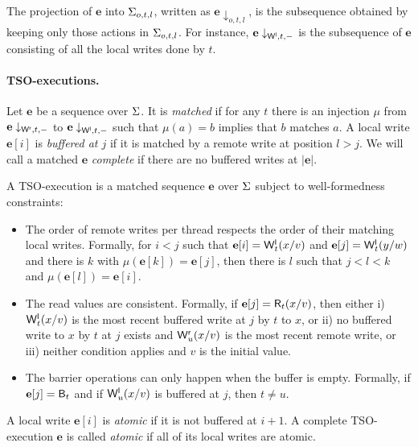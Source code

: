 The projection of $\mathbf{e}$ into $\Sigma_{o,t,l}$, written as $\mathbf{e}\downarrow_{o,t,l}$, is the subsequence obtained by keeping only those actions in $\Sigma_{o,t,l}$.
For instance, $\mathbf{e}\downarrow_{\mathsf{W}^{\mathsf{l}},t,-}$ is the subsequence of $\mathbf{e}$ consisting of all the local writes done by $t$.


\paragraph{TSO-executions.}
Let $\mathbf{e}$ be a sequence over $\Sigma$.
It is {\em matched} if for any $t$ there is an injection $\mu$ from $\mathbf{e}\downarrow_{\mathsf{W}^{\mathsf{r}},t,-}$ to $\mathbf{e}\downarrow_{\mathsf{W}^{\mathsf{l}},t,-}$ such that $\mu(a)=b$ implies that $b$ matches $a$.
A local write $\mathbf{e}[i]$ is {\em buffered at $j$} if it is matched by a remote write at position $l>j$.
We will call a matched $\mathbf{e}$ {\em complete} if there are no buffered writes at $|\mathbf{e}|$.

A TSO-execution is a matched sequence $\mathbf{e}$ over $\Sigma$ subject to well-formedness constraints:
\begin{itemize}
\item The order of remote writes per thread respects the order of their matching local writes.
Formally, for $i<j$ such that $\mathbf{e}[i]=\mathsf{W}^{\mathsf{l}}_{t}(x/v)$ and $\mathbf{e}[j]=\mathsf{W}^{\mathsf{l}}_{t}(y/w)$ and there is $k$ with $\mu(\mathbf{e}[k])=\mathbf{e}[j]$, then there is $l$ such that $j<l<k$ and $\mu(\mathbf{e}[l])=\mathbf{e}[i]$.
\item The read values are consistent.
Formally, if $\mathbf{e}[j]=\mathsf{R}_{t}(x/v)$, then either i) $\mathsf{W}^{\mathsf{l}}_{t}(x/v)$ is the most recent buffered write at $j$ by $t$ to $x$, or ii) no buffered write to $x$ by $t$ at $j$ exists and $\mathsf{W}^{\mathsf{r}}_{u}(x/v)$ is the most recent remote write, or iii) neither condition applies and $v$ is the initial value.
\item The barrier operations can only happen when the buffer is empty.
Formally, if $\mathbf{e}[j]=\mathsf{B}_{t}$ and if $\mathsf{W}^{\mathsf{l}}_{u}(x/v)$ is buffered at $j$, then $t\neq u$.
\end{itemize}



\begin{definition}[Atomic]
A local write $\mathbf{e}[i]$ is {\em atomic} if it is not buffered at $i+1$.
A complete TSO-execution $\mathbf{e}$ is called {\em atomic} if all of its local writes are atomic.
\end{definition}

